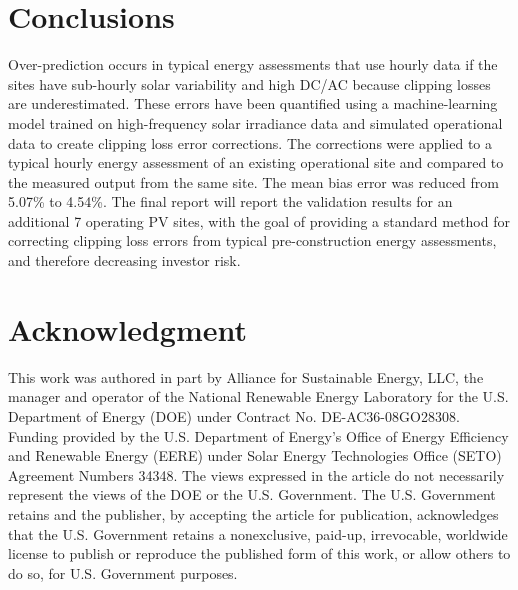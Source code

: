 \documentclass[conference]{IEEEtran}
\begin{document}
\section{Conclusions}
Over-prediction occurs in typical energy assessments that use hourly data if the sites have sub-hourly solar variability and high DC/AC because clipping losses are underestimated. These errors have been quantified using a machine-learning model trained on high-frequency solar irradiance data and simulated operational data to create clipping loss error corrections. The corrections were applied to a typical hourly energy assessment of an existing operational site and compared to the measured output from the same site. The mean bias error was reduced from 5.07\% to 4.54\%. The final report will report the validation results for an additional 7 operating PV sites, with the goal of providing a standard method for correcting clipping loss errors from typical pre-construction energy assessments, and therefore decreasing investor risk.

\section*{Acknowledgment}

This work was authored in part by Alliance for Sustainable Energy, LLC, the manager and operator of the National Renewable Energy Laboratory for the U.S. Department of Energy (DOE) under Contract No. DE-AC36-08GO28308. Funding provided by the U.S. Department of Energy’s Office of Energy Efficiency and Renewable Energy (EERE) under Solar Energy Technologies Office (SETO) Agreement Numbers 34348. The views expressed in the article do not necessarily represent the views of the DOE or the U.S. Government. The U.S. Government retains and the publisher, by accepting the article for publication, acknowledges that the U.S. Government retains a nonexclusive, paid-up, irrevocable, worldwide license to publish or reproduce the published form of this work, or allow others to do so, for U.S. Government purposes.



\end{document}
